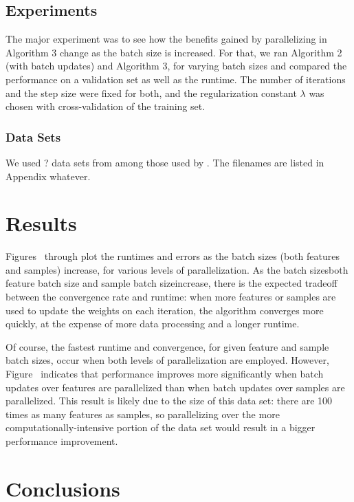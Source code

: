 \documentclass{article}
\begin{document}
\subsection{Experiments}
The major experiment was to see how the benefits gained by parallelizing in Algorithm 3 change as the batch size is increased.  For that, we ran Algorithm 2 (with batch updates) and Algorithm 3, for varying batch sizes and compared the performance on a validation set as well as the runtime. The number of iterations and the step size were fixed for both, and the regularization constant $\lambda$ was chosen with cross-validation of the training set.
\subsubsection{Data Sets}
We used ? data sets from among those used by \cite{shotgun2011}.  The filenames are listed in Appendix whatever.

\section{Results}


Figures~\cite{fig:NAME1} through \cite{fig:NAMEn} plot the runtimes and errors as the batch sizes (both features and samples) increase, for various levels of parallelization. As the batch sizes\textemdash both feature batch size and sample batch size\textemdash increase, there is the expected tradeoff between the convergence rate and runtime: when more features or samples are used to update the weights on each iteration, the algorithm converges more quickly, at the expense of more data processing and a longer runtime.

Of course, the fastest runtime and convergence, for given feature and sample batch sizes, occur when both levels of parallelization are employed. However, Figure~\cite{fig:NAME} indicates that performance improves more significantly when batch updates over features are parallelized than when batch updates over samples are parallelized. This result is likely due to the size of this data set: there are 100 times as many features as samples, so parallelizing over the more computationally-intensive portion of the data set would result in a bigger performance improvement.

\section{Conclusions}



\end{document}
